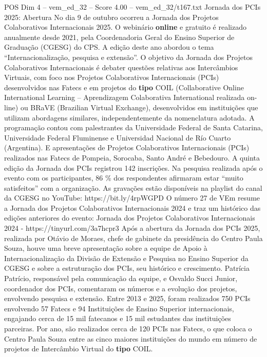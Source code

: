 \begin{textsample}{POS Dim 4 – vem\_ed\_32 – Score 4.00 – vem\_ed\_32/t167.txt}  \label{ex:f4_pos_034}
Jornada dos PCIs 2025: Abertura No dia 9 de outubro ocorreu a Jornada dos Projetos Colaborativos Internacionais 2025.
O webinário \textbf{online} e gratuito é realizado anualmente desde 2021, pela Coordenadoria Geral do Ensino Superior de Graduação (CGESG) do CPS.
A edição deste ano abordou o tema “Internacionalização, pesquisa e extensão”.
O objetivo da Jornada dos Projetos Colaborativos Internacionais é debater questões relativas aos Intercâmbios Virtuais, com foco nos Projetos Colaborativos Internacionais (PCIs) desenvolvidos nas Fatecs e em projetos do \textbf{tipo} COIL (Collaborative Online International Learning – Aprendizagem Colaborativa International realizada on-line) ou BRaVE (Brazilian Virtual Exchange), desenvolvidos em instituições que utilizam abordagens similares, independentemente da nomenclatura adotada.
A programação contou com palestrantes da Universidade Federal de Santa Catarina, Universidade Federal Fluminense e Universidad Nacional de Río Cuarto (Argentina).
E apresentações de Projetos Colaborativos Internacionais (PCIs) realizados nas Fatecs de Pompeia, Sorocaba, Santo André e Bebedouro.
A quinta edição da Jornada dos PCIs registrou 142 inscrições.
Na pesquisa realizada após o evento com os participantes, 86 \% dos respondentes afirmaram estar “muito satisfeitos” com a organização.
As gravações estão disponíveis na playlist do canal da CGESG no YouTube: https://bit.ly/4rpWGPD O número 27 de VEm resume a Jornada dos Projetos Colaborativos Internacionais 2024 e traz um histórico das edições anteriores do evento: Jornada dos Projetos Colaborativos Internacionais 2024 - https://tinyurl.com/3a7hcpr3 Após a abertura da Jornada dos PCIs 2025, realizada por Otávio de Moraes, chefe de gabinete da presidência do Centro Paula Souza, houve uma breve apresentação sobre a equipe de Apoio à Internacionalização da Divisão de Extensão e Pesquisa no Ensino Superior da CGESG e sobre a estruturação dos PCIs, seu histórico e crescimento.
Patrícia Patrício, responsável pela comunicação da equipe, e Osvaldo Succi Junior, coordenador dos PCIs, comentaram os números e a evolução dos projetos, envolvendo pesquisa e extensão.
Entre 2013 e 2025, foram realizados 750 PCIs envolvendo 57 Fatecs e 94 Instituições de Ensino Superior internacionais, engajando cerca de 15 mil fatecanos e 15 mil estudantes das instituições parceiras.
Por ano, são realizados cerca de 120 PCIs nas Fatecs, o que coloca o Centro Paula Souza entre as cinco maiores instituições do mundo em número de projetos de Intercâmbio Virtual do \textbf{tipo} COIL.

\end{textsample}
